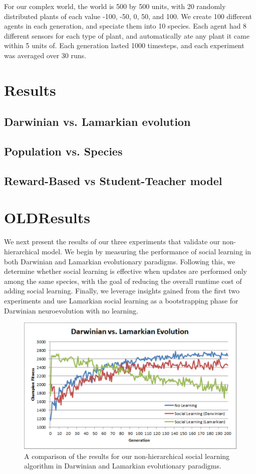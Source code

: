 \documentclass{acm_proc_article-sp}
\begin{document}
For our complex world, the world is 500 by 500 units, with 20 randomly distributed plants of each value -100, -50, 0, 50, and 100. We create 100 different agents in each generation, and speciate them into 10 species. Each agent had 8 different sensors for each type of plant, and automatically ate any plant it came within 5 units of. Each generation lasted 1000 timesteps, and each experiment was averaged over 30 runs.

\section{Results}
\label{sec:results}


\subsection*{Darwinian vs. Lamarkian evolution}
\subsection*{Population vs. Species}
\subsection*{Reward-Based vs Student-Teacher model}


\section{OLDResults}
\label{sec:results}
We next present the results of our three experiments that validate our non-hierarchical model. We begin by measuring the performance of social learning in both Darwinian and Lamarkian evolutionary paradigms. Following this, we determine whether social learning is effective when updates are performed only among the same species, with the goal of reducing the overall runtime cost of adding social learning. Finally, we leverage insights gained from the first two experiments and use Lamarkian social learning as a bootstrapping phase for Darwinian neuroevolution with no learning.

\begin{figure}
  \centering
    \includegraphics[scale=.35]{darwin_lamark.pdf}
  \caption{A comparison of the results for our non-hierarchical social learning algorithm in Darwinian and Lamarkian evolutionary paradigms.}
  \label{fig:darwin-lamark}
\end{figure}
\end{document}
